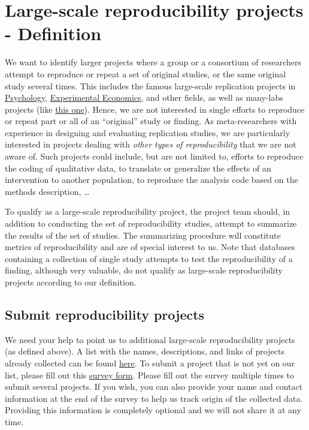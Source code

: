 \documentclass[a4paper,10.5pt]{report}
\begin{document}
\section*{Large-scale reproducibility projects - Definition}
We want to identify larger projects where a group or a consortium of researchers attempt to reproduce or repeat a set of original studies, or the same original study several times. This includes the famous large-scale replication projects in \href{https://doi.org/10.1126/science.aac4716}{Psychology}, \href{https://www.science.org/doi/10.1126/science.aaf0918}{Experimental Economics}, and other fields, as well as many-labs projects (like \href{https://osf.io/wx7ck/}{this one}). Hence, we are not interested in single efforts to reproduce or repeat part or all of an ``original'' study or finding. As meta-researchers with experience in designing and evaluating replication studies, we are particularly interested in projects dealing with \textit{other types of reproducibility} that we are not aware of. Such projects could include, but are not limited to, efforts to reproduce the coding of qualitative data, to translate or generalize the effects of an intervention to another population, to reproduce the analysis code based on the methods description, \dots

To qualify as a large-scale reproducibility project, the project team should, in addition to conducting the set of reproducibility studies, attempt to summarize the results of the set of studies. The summarizing procedure will constitute metrics of reproducibility and are of special interest to us. Note that databases containing a collection of single study attempts to test the reproducibility of a finding, although very valuable, do not qualify as large-scale reproducibility projects according to our definition.

\subsection*{Submit reproducibility projects}
We need your help to point us to additional large-scale reproducibility projects (as defined above). A list with the names, descriptions, and links of projects already collected can be found \href{https://docs.google.com/spreadsheets/d/1ZTmwL-t7s8u8bZ3fepC_M87zayWB2SQqUO5Ej19oz2o/edit?usp=sharing}{here}.
To submit a project that is not yet on our list, please fill out this \href{https://docs.google.com/forms/d/e/1FAIpQLSd26S-R7BoCN5QlBo0hKtfsRVj7b_bAXirVeaf1Cd41RIdhbA/viewform?usp=sf_link}{survey form}. Please fill out the survey multiple times to submit several projects. If you wish, you can also provide your name and contact information at the end of the survey to help us track origin of the collected data. Providing this information is completely optional and we will not share it at any time.
\end{document}

